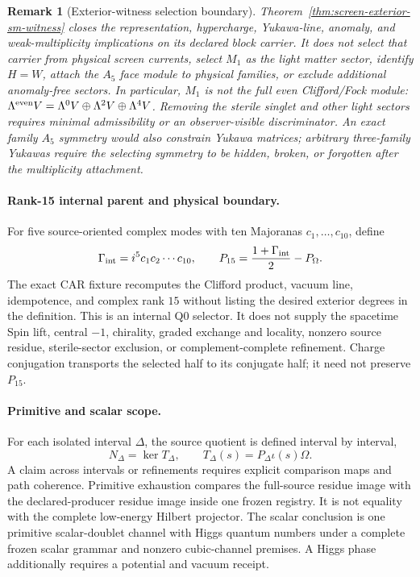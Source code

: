 \documentclass[11pt]{article}
\newtheorem{remark}[theorem]{Remark}
\begin{document}
\begin{remark}[Exterior-witness selection boundary]
Theorem~\ref{thm:screen-exterior-sm-witness} closes the representation,
hypercharge, Yukawa-line, anomaly, and weak-multiplicity implications on its
declared block carrier. It does not select that carrier from physical screen
currents, select \(M_1\) as the light matter sector, identify \(H=W\), attach
the \(A_5\) face module to physical families, or exclude additional anomaly-free
sectors. In particular, \(M_1\) is not the full even Clifford/Fock module:
\(\Lambda^{\rm even}V=\Lambda^0V\oplus\Lambda^2V\oplus\Lambda^4V\).
Removing the sterile singlet and other light sectors requires minimal
admissibility or an observer-visible discriminator. An exact family \(A_5\)
symmetry would also constrain Yukawa matrices; arbitrary three-family Yukawas
require the selecting symmetry to be hidden, broken, or forgotten after the
multiplicity attachment.
\end{remark}

\paragraph{Rank-15 internal parent and physical boundary.}
For five source-oriented complex modes with ten Majoranas
\(c_1,\ldots,c_{10}\), define
\[
\Gamma_{\rm int}=i^5c_1c_2\cdots c_{10},
\qquad
P_{15}=\frac{1+\Gamma_{\rm int}}2-P_\Omega .
\]
The exact CAR fixture recomputes the Clifford product, vacuum line,
idempotence, and complex rank \(15\) without listing the desired exterior
degrees in the definition. This is an internal Q0 selector. It does not supply
the spacetime Spin lift, central \(-1\), chirality, graded exchange and
locality, nonzero source residue, sterile-sector exclusion, or
complement-complete refinement. Charge conjugation transports the selected
half to its conjugate half; it need not preserve \(P_{15}\).

\paragraph{Primitive and scalar scope.}
For each isolated interval \(\Delta\), the source quotient is defined
interval by interval,
\[
N_\Delta=\ker T_\Delta,\qquad
T_\Delta(s)=P_\Delta\iota(s)\Omega .
\]
A claim across intervals or refinements requires explicit comparison maps and
path coherence. Primitive exhaustion compares the full-source residue image
with the declared-producer residue image inside one frozen registry. It is not
equality with the complete low-energy Hilbert projector. The scalar conclusion
is one primitive scalar-doublet channel with Higgs quantum numbers under a
complete frozen scalar grammar and nonzero cubic-channel premises. A Higgs
phase additionally requires a potential and vacuum receipt.
\end{document}

